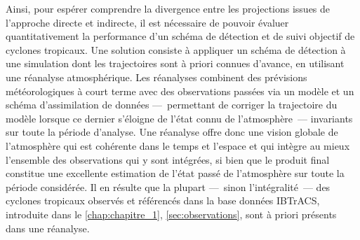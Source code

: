 \documentclass[../main.tex]{subfiles}
\begin{document}
Ainsi, pour espérer comprendre la divergence entre les projections issues de l'approche directe et indirecte, il est nécessaire de pouvoir évaluer
quantitativement la performance d'un schéma de détection et de suivi objectif de cyclones tropicaux. Une solution consiste à appliquer un schéma de détection à
une simulation dont les trajectoires sont à priori connues d'avance, en utilisant une réanalyse atmosphérique. Les réanalyses combinent des prévisions
météorologiques à court terme avec des observations passées via un modèle et un schéma d'assimilation de données ---~permettant de corriger la trajectoire du
modèle lorsque ce dernier s'éloigne de l'état connu de l'atmosphère~--- invariants sur toute la période d'analyse. Une réanalyse offre donc une vision globale
de l'atmosphère qui est cohérente dans le temps et l'espace et qui intègre au mieux l'ensemble des observations qui y sont intégrées, si bien que le produit
final constitue une excellente estimation de l'état passé de l'atmosphère sur toute la période considérée. Il en résulte que la plupart ---~sinon
l'intégralité~--- des cyclones tropicaux observés et référencés dans la base données IBTrACS, introduite dans le \cref{chap:chapitre_1},
\cref{sec:observations}, sont à priori présents dans une réanalyse.
\end{document}

